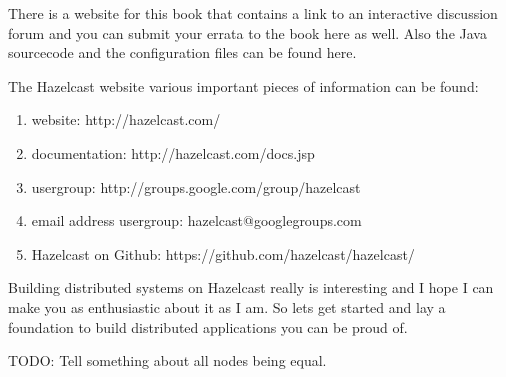 There is a website for this book that contains a link to an interactive discussion forum and you can submit your errata to the book here as well. Also the Java sourcecode and the configuration files can be found here. 

The Hazelcast website various important pieces of information can be found:
\begin{enumerate}
\item website: http://hazelcast.com/
\item documentation: http://hazelcast.com/docs.jsp
\item usergroup: http://groups.google.com/group/hazelcast
\item email address usergroup: hazelcast@googlegroups.com
\item Hazelcast on Github: https://github.com/hazelcast/hazelcast/
\end{enumerate}

Building distributed systems on Hazelcast really is interesting and I hope I can make you as enthusiastic about it as I am. So lets get started and lay a foundation to build distributed applications you can be proud of.

TODO: Tell something about all nodes being equal.

